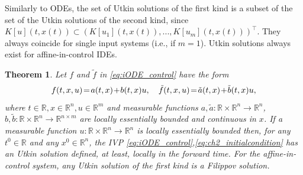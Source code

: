 \documentclass{article}
\newcommand{\R}{\mathbb{R}}
\newtheorem{theorem}{Theorem}
\begin{document}
Similarly to ODEs,  
the set of Utkin solutions of the first  kind is a subset of the set of the Utkin solutions of the second kind, since $K[u](t,x(t))\subset (K[u_1](t,x(t)),...,K[u_m](t,x(t)))^{\top}$. They always coincide for single input systems
(i.e., if $m=1$).
Utkin solutions always exist for affine-in-control IDEs.
\begin{theorem}\label{thm:sol_iODE_Utkin}\itshape 
 Let $f$ and $\tilde f$ in \eqref{eq:iODE_control} have the form\vspace{-1mm}
\begin{equation*}
	f(t,x,u)\!=\!a(t,x)\!+\!b(t,x)u,\quad  \tilde f(t,x,u)\!=\!\tilde a(t,x)\!+\!\tilde b(t,x)u,\vspace{-1mm}
\end{equation*}
where $t\in \R, x\in \R^n, u\in \R^m$ and 
measurable functions $a,\tilde a:\R\times \R^n \to \R^n$, $b,\tilde b: \R\times \R^n\to \R^{n\times m}$ are locally essentially bounded and continuous in $x$.
If  a measurable function $u:\R\times\R^n\to \R^n$ is locally essentially bounded then,
for any $t^0\in \R$ and any $x^0\in \R^n$,
the IVP \eqref{eq:iODE_control},\eqref{eq:ch2_initialcondition}  has an Utkin solution defined, at least, locally in the forward time.
For the affine-in-control system, any Utkin solution of the first kind  is a Filippov solution.
\end{theorem}
\end{document}
